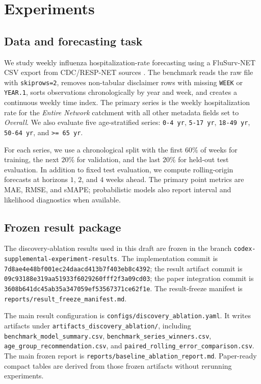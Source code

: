 \section{Experiments}

\subsection{Data and forecasting task}

We study weekly influenza hospitalization-rate forecasting using a
FluSurv-NET CSV export from CDC/RESP-NET sources
\cite{cdcFluSurvNet2026,cdcRespNet2026,naquin2024flusurvnet}. The benchmark
reads the raw file with
\texttt{skiprows=2}, removes non-tabular disclaimer rows with missing
\texttt{WEEK} or \texttt{YEAR.1}, sorts observations chronologically by year
and week, and creates a continuous weekly time index. The primary series is
the weekly hospitalization rate for the \emph{Entire Network} catchment with
all other metadata fields set to \emph{Overall}. We also evaluate five
age-stratified series: \texttt{0-4 yr}, \texttt{5-17 yr},
\texttt{18-49 yr}, \texttt{50-64 yr}, and \texttt{>= 65 yr}.

For each series, we use a chronological split with the first $60\%$ of weeks
for training, the next $20\%$ for validation, and the last $20\%$ for held-out
test evaluation. In addition to fixed test evaluation, we compute
rolling-origin forecasts at horizons $1$, $2$, and $4$ weeks ahead. The primary
point metrics are MAE, RMSE, and sMAPE; probabilistic models also report
interval and likelihood diagnostics when available.

\subsection{Frozen result package}

The discovery-ablation results used in this draft are frozen in the branch
\texttt{codex-supplemental-experiment-results}. The implementation commit is
\texttt{7d8ae4e48bf001ec24daacd413b7f403eb8c4392}; the result artifact commit
is \texttt{09c93188e319aa51933f6029260fff2f3a09cd03}; the paper
integration commit is
\texttt{3608b641dc45ab35a347059ef53567371ce62f1e}. The result-freeze
manifest is \texttt{reports/result\_freeze\_manifest.md}.

The main result configuration is
\texttt{configs/discovery\_ablation.yaml}. It writes artifacts under
\texttt{artifacts\_discovery\_ablation/}, including
\texttt{benchmark\_model\_summary.csv},
\texttt{benchmark\_series\_winners.csv},
\texttt{age\_group\_recommendation.csv}, and
\texttt{paired\_rolling\_error\_comparison.csv}. The main frozen report is
\texttt{reports/baseline\_ablation\_report.md}. Paper-ready compact tables
are derived from those frozen artifacts without rerunning experiments.

